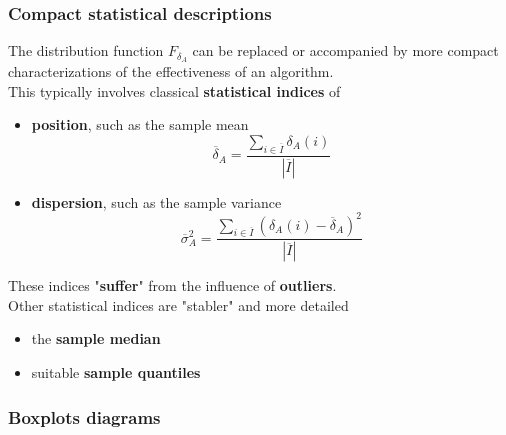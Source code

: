 
\newpage

\subsubsection{Compact statistical descriptions}
The distribution function $F_{\delta_A}$ can be replaced or accompanied by more compact characterizations of the effectiveness of an algorithm.\\

This typically involves classical \textbf{statistical indices} of 
\begin{itemize}
	\item \textbf{position}, such as the sample mean
	$$ \overline{\delta}_A = \frac{\sum_{i \in \overline{I}} \delta_A (i)}{|\overline{I}|} $$
	\item \textbf{dispersion}, such as the sample variance
	$$ \overline{\sigma}_A^2 = \frac{\sum_{i \in \overline{I}} \left(\delta_A (i) - \overline{\delta}_A \right)^2}{|\overline{I}|} $$
\end{itemize}
These indices "\textbf{suffer}" from the influence of \textbf{outliers}.\\

Other statistical indices are "stabler" and more detailed
\begin{itemize}
	\item the \textbf{sample median}
	\item suitable \textbf{sample quantiles}
\end{itemize}

\newpage

\subsubsection{Boxplots diagrams}
